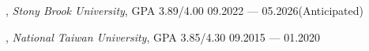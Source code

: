 


, \textit{Stony Brook University}, GPA 3.89/4.00	\hfill 09.2022 --- 05.2026(Anticipated)

, \textit{National Taiwan University}, GPA 3.85/4.30 \hfill	09.2015 --- 01.2020
